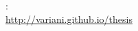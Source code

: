 
\thispagestyle{empty}

\hfill

\vfill

\noindent\myName: \textit{\myTitle} \\ %
\href{http://variani.github.io/thesis}{http://variani.github.io/thesis} \\
\textcopyright\ \myTime







